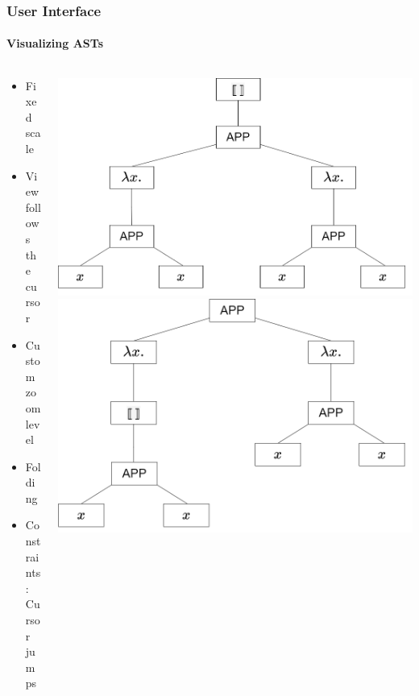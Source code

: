 \documentclass{beamer}
\begin{document}
\begin{frame}
    \frametitle{User Interface}
    \framesubtitle{Visualizing ASTs}

    \begin{columns}
        \begin{column}{0.5\textwidth}
            \begin{itemize}
                \item Fixed scale
                    \pause
                \item View follows the cursor
                    \pause
                \item Custom zoom level
                    \pause
                \item Folding
                    \pause
                \item Constraints: Cursor jumps
            \end{itemize}
        \end{column}

        \begin{column}{0.5\textwidth}
            \includegraphics[width=\textwidth]{../assets/ast_root_cursor.png}
            \phantom{Forced spacing}
            \includegraphics[width=\textwidth]{../assets/ast_subtree_cursor.png}
        \end{column}
    \end{columns}
\end{frame}
\end{document}
